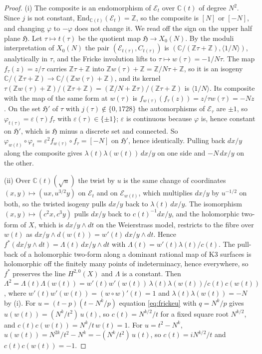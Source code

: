 \documentclass[11pt,reqno]{amsart}
\numberwithin{equation}{section}
\theoremstyle{plain}
\theoremstyle{definition}
\newcommand{\ZZ}{\mathbb{Z}}
\newcommand{\CC}{\mathbb{C}}
\newcommand{\End}{\mathrm{End}}
\begin{document}
\begin{proof}
(i) The composite is an endomorphism of $\mathcal{E}_{t}$ over $\CC(t)$ of degree $N^{2}$. Since $j$ is not constant, $\End_{\CC(t)}(\mathcal{E}_{t})=\ZZ$, so the composite is $[N]$ or $[-N]$, and changing $\varphi$ to $-\varphi$ does not change it. We read off the sign on the upper half plane $\mathfrak{H}$. Let $\tau\mapsto t(\tau)$ be the quotient map $\mathfrak{H}\to X_{0}(N)$. By the moduli interpretation of $X_{0}(N)$ the pair $(\mathcal{E}_{t(\tau)},C_{t(\tau)})$ is $(\CC/(\ZZ\tau+\ZZ),\langle1/N\rangle)$, analytically in $\tau$, and the Fricke involution lifts to $\tau\mapsto w(\tau)=-1/N\tau$. The map $f_{\tau}(z)=z/\tau$ carries $\ZZ\tau+\ZZ$ into $\ZZ w(\tau)+\ZZ=\ZZ/N\tau+\ZZ$, so it is an isogeny $\CC/(\ZZ\tau+\ZZ)\to\CC/(\ZZ w(\tau)+\ZZ)$, and its kernel $\tau(\ZZ w(\tau)+\ZZ)/(\ZZ\tau+\ZZ)=(\ZZ/N+\ZZ\tau)/(\ZZ\tau+\ZZ)$ is $\langle1/N\rangle$. Its composite with the map of the same form at $w(\tau)$ is $f_{w(\tau)}(f_{\tau}(z))=z/\tau w(\tau)=-Nz$. On the set $\mathfrak{H}'$ of $\tau$ with $j(\tau)\notin\{0,1728\}$ the automorphisms of $\mathcal{E}_{\tau}$ are $\pm1$, so $\varphi_{t(\tau)}=\varepsilon(\tau)f_{\tau}$ with $\varepsilon(\tau)\in\{\pm1\}$; $\varepsilon$ is continuous because $\varphi$ is, hence constant on $\mathfrak{H}'$, which is $\mathfrak{H}$ minus a discrete set and connected. So $\varphi_{w(t)}\circ\varphi_{t}=\varepsilon^{2}f_{w(\tau)}\circ f_{\tau}=[-N]$ on $\mathfrak{H}'$, hence identically. Pulling back $dx/y$ along the composite gives $\lambda(t)\lambda(w(t))\,dx/y$ on one side and $-N\,dx/y$ on the other.

(ii) Over $\CC(t)(\sqrt u)$ the twist by $u$ is the same change of coordinates $(x,y)\mapsto(ux,u^{3/2}y)$ on $\mathcal{E}_{t}$ and on $\mathcal{E}_{w(t)}$, which multiplies $dx/y$ by $u^{-1/2}$ on both, so the twisted isogeny pulls $dx/y$ back to $\lambda(t)\,dx/y$. The isomorphism $(x,y)\mapsto(c^{2}x,c^{3}y)$ pulls $dx/y$ back to $c(t)^{-1}dx/y$, and the holomorphic two-form of $X$, which is $dx/y\wedge dt$ on the Weierstrass model, restricts to the fibre over $w(t)$ as $dx/y\wedge d(w(t))=w'(t)\,dx/y\wedge dt$. Hence $f^{*}(dx/y\wedge dt)=\Lambda(t)\,dx/y\wedge dt$ with $\Lambda(t)=w'(t)\lambda(t)/c(t)$. The pull-back of a holomorphic two-form along a dominant rational map of K3 surfaces is holomorphic off the finitely many points of indeterminacy, hence everywhere, so $f^{*}$ preserves the line $H^{2,0}(X)$ and $\Lambda$ is a constant. Then $\Lambda^{2}=\Lambda(t)\Lambda(w(t))=w'(t)w'(w(t))\,\lambda(t)\lambda(w(t))/c(t)c(w(t))$, where $w'(t)w'(w(t))=(w\circ w)'(t)=1$ and $\lambda(t)\lambda(w(t))=-N$ by (i). For $u=(t-p)(t-N^{k}/p)$ equation \eqref{eq:frickeu} with $q=N^{k}/p$ gives $u(w(t))=(N^{k}/t^{2})\,u(t)$, so $c(t)=N^{k/2}/t$ for a fixed square root $N^{k/2}$, and $c(t)c(w(t))=N^{k}/t\,w(t)=1$. For $u=t^{2}-N^{k}$, $u(w(t))=N^{2k}/t^{2}-N^{k}=-(N^{k}/t^{2})\,u(t)$, so $c(t)=iN^{k/2}/t$ and $c(t)c(w(t))=-1$.
\end{proof}
\end{document}
